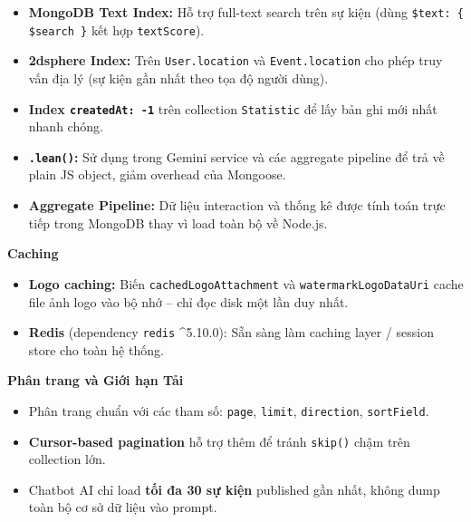 \begin{itemize}[leftmargin=*, label={--}]
    \item \textbf{MongoDB Text Index:} Hỗ trợ full-text search trên sự kiện
    (dùng \texttt{\$text: \{ \$search \}} kết hợp \texttt{textScore}).

    \item \textbf{2dsphere Index:} Trên \texttt{User.location} và
    \texttt{Event.location} cho phép truy vấn địa lý (sự kiện gần nhất theo
    tọa độ người dùng).

    \item \textbf{Index \texttt{createdAt: -1}} trên collection
    \texttt{Statistic} để lấy bản ghi mới nhất nhanh chóng.

    \item \textbf{\texttt{.lean()}:} Sử dụng trong Gemini service và các
    aggregate pipeline để trả về plain JS object, giảm overhead của Mongoose.

    \item \textbf{Aggregate Pipeline:} Dữ liệu interaction và thống kê được
    tính toán trực tiếp trong MongoDB thay vì load toàn bộ về Node.js.
\end{itemize}

\textbf{Caching}

\begin{itemize}[leftmargin=*, label={--}]
    \item \textbf{Logo caching:} Biến \texttt{cachedLogoAttachment} và
    \texttt{watermarkLogoDataUri} cache file ảnh logo vào bộ nhớ -- chỉ đọc
    disk một lần duy nhất.

    \item \textbf{Redis} (dependency \texttt{redis} \^{}5.10.0): Sẵn sàng làm
    caching layer / session store cho toàn hệ thống.
\end{itemize}

\textbf{Phân trang và Giới hạn Tải}

\begin{itemize}[leftmargin=*, label={--}]
    \item Phân trang chuẩn với các tham số: \texttt{page}, \texttt{limit},
    \texttt{direction}, \texttt{sortField}.

    \item \textbf{Cursor-based pagination} hỗ trợ thêm để tránh \texttt{skip()}
    chậm trên collection lớn.

    \item Chatbot AI chỉ load \textbf{tối đa 30 sự kiện} published gần nhất,
    không dump toàn bộ cơ sở dữ liệu vào prompt.
\end{itemize}

